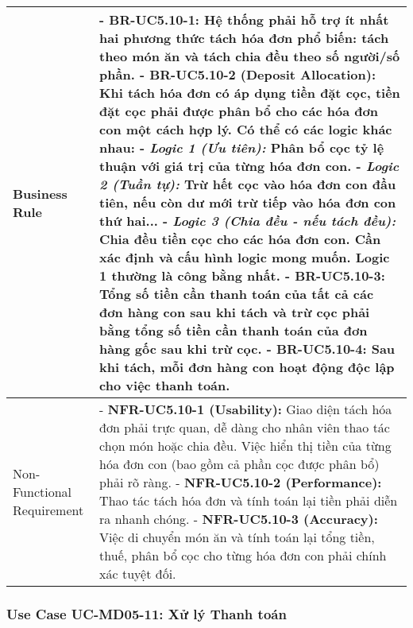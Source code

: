 \begin{longtable}{|m{4cm}|p{11cm}|}
Business Rule & - \textbf{BR-UC5.10-1:} Hệ thống phải hỗ trợ ít nhất hai phương thức tách hóa đơn phổ biến: tách theo món ăn và tách chia đều theo số người/số phần. \newline - \textbf{BR-UC5.10-2 (Deposit Allocation):} Khi tách hóa đơn có áp dụng tiền đặt cọc, tiền đặt cọc phải được phân bổ cho các hóa đơn con một cách hợp lý. Có thể có các logic khác nhau: \newline    - \textit{Logic 1 (Ưu tiên):} Phân bổ cọc tỷ lệ thuận với giá trị của từng hóa đơn con. \newline    - \textit{Logic 2 (Tuần tự):} Trừ hết cọc vào hóa đơn con đầu tiên, nếu còn dư mới trừ tiếp vào hóa đơn con thứ hai... \newline    - \textit{Logic 3 (Chia đều - nếu tách đều):} Chia đều tiền cọc cho các hóa đơn con. \newline    Cần xác định và cấu hình logic mong muốn. Logic 1 thường là công bằng nhất. \newline - \textbf{BR-UC5.10-3:} Tổng số tiền cần thanh toán của tất cả các đơn hàng con sau khi tách và trừ cọc phải bằng tổng số tiền cần thanh toán của đơn hàng gốc sau khi trừ cọc. \newline - \textbf{BR-UC5.10-4:} Sau khi tách, mỗi đơn hàng con hoạt động độc lập cho việc thanh toán. \\
\hline
Non-Functional Requirement & - \textbf{NFR-UC5.10-1 (Usability):} Giao diện tách hóa đơn phải trực quan, dễ dàng cho nhân viên thao tác chọn món hoặc chia đều. Việc hiển thị tiền của từng hóa đơn con (bao gồm cả phần cọc được phân bổ) phải rõ ràng. \newline - \textbf{NFR-UC5.10-2 (Performance):} Thao tác tách hóa đơn và tính toán lại tiền phải diễn ra nhanh chóng. \newline - \textbf{NFR-UC5.10-3 (Accuracy):} Việc di chuyển món ăn và tính toán lại tổng tiền, thuế, phân bổ cọc cho từng hóa đơn con phải chính xác tuyệt đối. \\
\hline
\end{longtable}

\subsubsection{Use Case UC-MD05-11: Xử lý Thanh toán}

